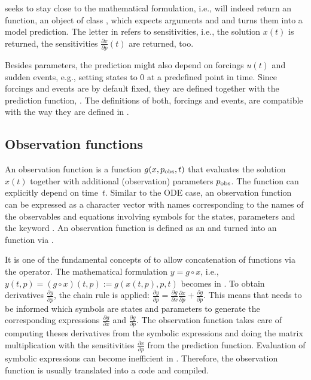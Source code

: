 \documentclass[article]{jss}
\begin{document}
 seeks to stay close to the mathematical formulation, i.e.,  will indeed return an  function, an object of class , which expects arguments  and  and turns them into a model prediction. The letter  in  refers to sensitivities, i.e., the solution $x(t)$ is returned, the sensitivities $\frac{\partial x}{\partial p}(t)$ are returned, too.

Besides parameters, the prediction might also depend on forcings $u(t)$ and sudden events, e.g., setting states to 0 at a predefined point in time. Since forcings and events are by default fixed, they are defined together with the  prediction function, . The definitions of both, forcings and events, are compatible with the way they are defined in .

\subsection{Observation functions}


An observation function is a function $g(x, p_{\rm obs}, t)$ that evaluates the solution $x(t)$ together with additional (observation) parameters $p_{\rm obs}$. The function can explicitly depend on time~$t$. Similar to the ODE case, an observation function can be expressed as a character vector with names corresponding to the names of the observables and equations involving symbols for the states, parameters and the keyword . An observation function is defined as an  and turned into an  function via .

It is one of the fundamental concepts of  to allow concatenation of functions via the  operator. The mathematical formulation $y = g\circ x$, i.e., $y(t, p) = (g\circ x)(t, p):= g(x(t, p), p, t)$ becomes  in . To obtain derivatives $\frac{\partial y}{\partial p}$, the chain rule is applied: $\frac{\partial y}{\partial p} = \frac{\partial g}{\partial x}\frac{\partial x}{\partial p} + \frac{\partial g}{\partial p}$. This means that  needs to be informed which symbols are states and parameters to generate the corresponding expressions $\frac{\partial g}{\partial x}$ and $\frac{\partial g}{\partial p}$. The observation function  takes care of computing theses derivatives from the symbolic expressions and doing the matrix multiplication with the sensitivities $\frac{\partial x}{\partial p}$ from the prediction function. Evaluation of symbolic expressions can become inefficient in . Therefore, the observation function is usually translated into a  code and compiled.
\end{document}
